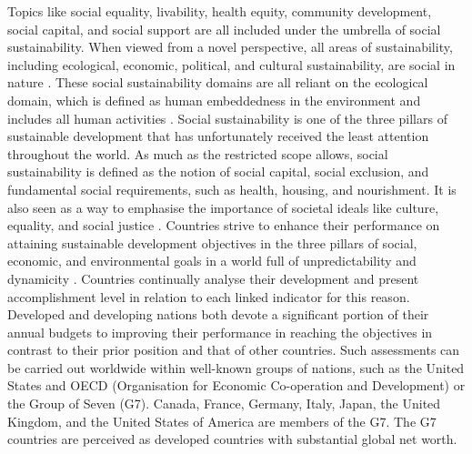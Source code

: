 \documentclass{infor}
\theoremstyle{remark}
\begin{document}
Topics like social equality, livability, health equity, community development, social capital, and social support are all included under the umbrella of social sustainability. When viewed from a novel perspective, all areas of sustainability, including ecological, economic, political, and cultural sustainability, are social in nature \cite{schonborn2019social}. These social sustainability domains are all reliant on the ecological domain, which is defined as human embeddedness in the environment and includes all human activities \citep{james2014urban}. Social sustainability is one of the three pillars of sustainable development that has unfortunately received the least attention throughout the world. As much as the restricted scope allows, social sustainability is defined as the notion of social capital, social exclusion, and fundamental social requirements, such as health, housing, and nourishment. It is also seen as a way to emphasise the importance of societal ideals like culture, equality, and social justice \citep{koning2001social}. Countries strive to enhance their performance on attaining sustainable development objectives in the three pillars of social, economic, and environmental goals in a world full of unpredictability and dynamicity \citep{precup2020model}. Countries continually analyse their development and present accomplishment level in relation to each linked indicator for this reason. Developed and developing nations both devote a significant portion of their annual budgets to improving their performance in reaching the objectives in contrast to their prior position and that of other countries. Such assessments can be carried out worldwide within well-known groups of nations, such as the United States and OECD (Organisation for Economic Co-operation and Development) or the Group of Seven (G7). Canada, France, Germany, Italy, Japan, the United Kingdom, and the United States of America are members of the G7. The G7 countries are perceived as developed countries with substantial global net worth.
\end{document}
